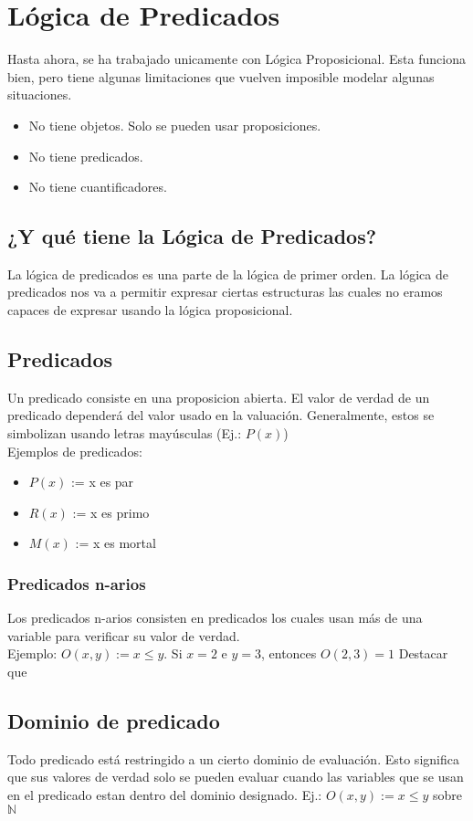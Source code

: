 \documentclass{article}
\begin{document}
\section{Lógica de Predicados}
Hasta ahora, se ha trabajado unicamente con Lógica Proposicional. Esta funciona bien, pero tiene algunas limitaciones que vuelven imposible modelar algunas situaciones.
\begin{itemize}
    \item No tiene objetos. Solo se pueden usar proposiciones.
    \item No tiene predicados.
    \item No tiene cuantificadores.
\end{itemize}

\subsection{¿Y qué tiene la Lógica de Predicados?}
La lógica de predicados es una parte de la lógica de primer orden. La lógica de predicados nos va a permitir expresar ciertas estructuras las cuales no eramos capaces de expresar usando la lógica proposicional.

\subsection{Predicados}
Un predicado consiste en una proposicion abierta. El valor de verdad de un predicado dependerá del valor usado en la valuación. Generalmente, estos se simbolizan usando letras mayúsculas (Ej.: $P(x)$)\\
Ejemplos de predicados:
\begin{itemize}
    \item $P(x)$ := x es par
    \item $R(x)$ := x es primo
    \item $M(x)$ := x es mortal
\end{itemize}

\subsubsection{Predicados n-arios}
Los predicados n-arios consisten en predicados los cuales usan más de una variable para verificar su valor de verdad.\\
Ejemplo: $O(x,y) := x \leq y $. Si $x = 2$ e $y = 3$, entonces $O(2,3) = 1$
Destacar que 

\subsection{Dominio de predicado}
Todo predicado está restringido a un cierto dominio de evaluación. Esto significa que sus valores de verdad solo se pueden evaluar cuando las variables que se usan en el predicado estan dentro del dominio designado.
Ej.: $O(x,y) := x \leq{} y$ sobre $\mathds{N}$
\end{document}
